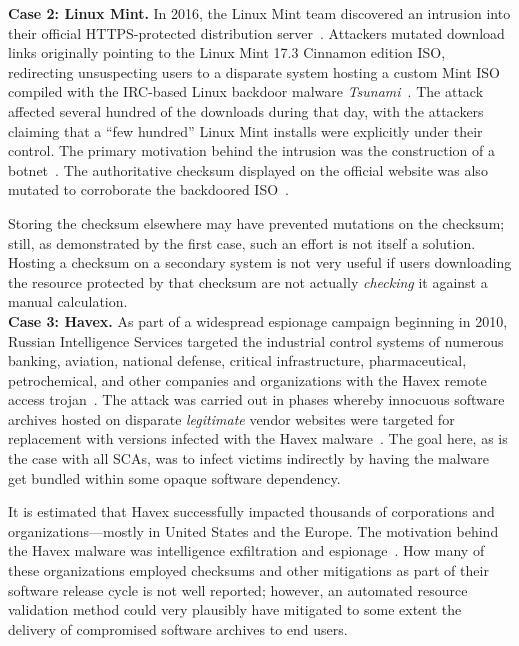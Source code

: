 \noindent\textbf{Case 2: Linux Mint.} In 2016, the Linux Mint team discovered an
intrusion into their official HTTPS-protected distribution
server~\cite{SCA-MINT1}. Attackers mutated download links originally pointing to
the Linux Mint 17.3 Cinnamon edition ISO, redirecting unsuspecting users to a
disparate system hosting a custom Mint ISO compiled with the IRC-based Linux
backdoor malware \emph{Tsunami}~\cite{SCA-MINT2}. The attack affected several
hundred of the downloads during that day, with the attackers claiming that a
``few hundred'' Linux Mint installs were explicitly under their control. The
primary motivation behind the intrusion was the construction of a
botnet~\cite{SCA-MINT3}. The authoritative checksum displayed on the official
website was also mutated to corroborate the backdoored ISO~\cite{SCA-MINT3}.

Storing the checksum elsewhere may have prevented mutations on the checksum;
still, as demonstrated by the first case, such an effort is not itself a
solution. Hosting a checksum on a secondary system is not very useful if users
downloading the resource protected by that checksum are not actually
\emph{checking} it against a manual calculation. \\

\noindent\textbf{Case 3: Havex.} As part of a widespread espionage campaign
beginning in 2010, Russian Intelligence Services targeted the industrial control
systems of numerous banking, aviation, national defense, critical
infrastructure, pharmaceutical, petrochemical, and other companies and
organizations with the Havex remote access trojan~\cite{SCA-HAVEX1, SCA-HAVEX2}.
The attack was carried out in phases whereby innocuous software archives hosted
on disparate \emph{legitimate} vendor websites were targeted for replacement
with versions infected with the Havex malware~\cite{SCA-HAVEX2}. The goal here,
as is the case with all SCAs, was to infect victims indirectly by having the
malware get bundled within some opaque software dependency.

It is estimated that Havex successfully impacted thousands of corporations and
organizations---mostly in United States and the Europe. The motivation behind
the Havex malware was intelligence exfiltration and espionage~\cite{SCA-HAVEX1}.
How many of these organizations employed checksums and other mitigations as part
of their software release cycle is not well reported; however, an automated
resource validation method could very plausibly have mitigated to some extent
the delivery of compromised software archives to end users. \\

